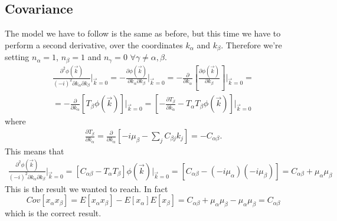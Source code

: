 \documentclass[a4paper,11pt,fleqn]{article}
\begin{document}
\subsection{Covariance}
The model we have to follow is the same as before, but this time we have to 
perform a second derivative, over the coordinates $k_{\alpha}$ and $k_{\beta}$.
Therefore we're setting $n_{\alpha}=1$, $n_{\beta}=1$ and $n_{\gamma}=0$ $\forall \gamma \neq \alpha, \beta$.
\begin{gather*}
    \frac{\partial^2\phi(\vec{k})}{(-i)^2\partial k_{\alpha}\partial k_{\beta}}\Big|_{\vec{k}=0} = -\frac{\partial \phi (\vec{k})}{\partial k_{\alpha}\partial k_{\beta}} \Big|_{\vec{k}=0}= -\frac{\partial}{\partial k_{\alpha}}\left[\frac{\partial \phi(\vec{k})}{\partial k_{\beta}}\right]\Big|_{\vec{k}=0} =\\
    = -\frac{\partial}{\partial k_{\alpha}}\left[T_{\beta}\phi(\vec{k})\right]\Big|_{\vec{k}=0} = \left[-\frac{\partial T_{\beta}}{\partial k_{\alpha}} -T_{\alpha}T_{\beta}\phi(\vec{k})\right]\Big|_{\vec{k}=0}
\end{gather*}
where
\begin{gather*}
    \frac{\partial T_{\beta}}{\partial k_{\alpha}} = \frac{\partial}{\partial k_{\alpha}}\left[-i\mu_{\beta}-\sum_j C_{\beta j}k_j\right] = -C_{\alpha \beta}.
\end{gather*}
This means that
\begin{gather*}
    \frac{\partial^2\phi(\vec{k})}{(-i)^2\partial k_{\alpha}\partial k_{\beta}}\Big|_{\vec{k}=0} = [C_{\alpha \beta}-T_{\alpha}T_{\beta}]\phi(\vec{k})\Big|_{\vec{k}=0} = [C_{\alpha \beta}- (-i\mu_{\alpha})(-i\mu_{\beta})] = C_{\alpha \beta} +\mu_{\alpha}\mu_{\beta}
\end{gather*}
This is the result we wanted to reach. In fact 
\begin{equation}
    Cov[x_{\alpha}x_{\beta}] = E[x_{\alpha}x_{\beta}] - E[x_{\alpha}]E[x_{\beta}] = C_{\alpha \beta} +\mu_{\alpha}\mu_{\beta} - \mu_{\alpha}\mu_{\beta} = C_{\alpha \beta}
\end{equation}
which is the correct result. 






\end{document}
